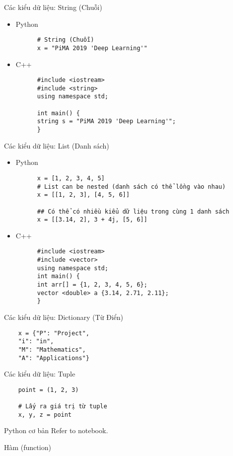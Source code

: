 \documentclass[10pt]{beamer}
\begin{document}
\begin{frame}[fragile]{Các kiểu dữ liệu: String (Chuỗi)}
  \begin{itemize}
    \item Python
    \begin{verbatim}
      # String (Chuỗi)
      x = "PiMA 2019 'Deep Learning'"
    \end{verbatim}

    \item C++
    \begin{verbatim}
      #include <iostream>
      #include <string>
      using namespace std;

      int main() {
      string s = "PiMA 2019 'Deep Learning'";
      }
    \end{verbatim}
  \end{itemize}

\end{frame}


\begin{frame}[fragile]{Các kiểu dữ liệu: List (Danh sách)}

  \begin{itemize}
    \item Python
    \begin{verbatim}
      x = [1, 2, 3, 4, 5]
      # List can be nested (danh sách có thể lồng vào nhau)
      x = [[1, 2, 3], [4, 5, 6]]

      ## Có thể có nhiều kiểu dữ liệu trong cùng 1 danh sách
      x = [[3.14, 2], 3 + 4j, [5, 6]]
    \end{verbatim}
    \item C++
    \begin{verbatim}
      #include <iostream>
      #include <vector>
      using namespace std;
      int main() {
      int arr[] = {1, 2, 3, 4, 5, 6};
      vector <double> a {3.14, 2.71, 2.11};
      }
    \end{verbatim}
  \end{itemize}
\end{frame}

\begin{frame}[fragile]{Các kiểu dữ liệu: Dictionary (Từ Điển)}
  \begin{verbatim}
    x = {"P": "Project",
    "i": "in",
    "M": "Mathematics",
    "A": "Applications"}
  \end{verbatim}
\end{frame}

\begin{frame}[fragile]{Các kiểu dữ liệu: Tuple}
  \begin{verbatim}
    point = (1, 2, 3)

    # Lấy ra giá trị từ tuple
    x, y, z = point
  \end{verbatim}


\end{frame}


\begin{frame}[fragile]{Python cơ bản}
  Refer to notebook.
\end{frame}

\begin{frame}[fragile]{Hàm (function)}

\end{frame}

% 
%
%   
%   
%
\end{document}
